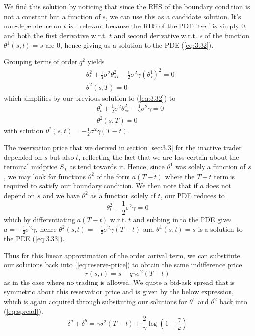 We find this solution by noticing
that since the RHS of the boundary condition is not a constant but a function of $s$,
we can use this as a candidate solution. It's non-dependence on $t$ is irrelevant 
because the RHS of the PDE itself is simply $0$, and both the first derivative w.r.t.
$t$ and second derivative w.r.t. $s$ of the function $\theta^1(s,t)=s$ are $0$, hence 
giving us a solution to the PDE (\ref{eq:3.32}). 

Grouping terms of order $q^2$ yields
\begin{equation}\label{eq:3.33}
    \begin{aligned}
        &\theta^2_t+\frac{1}{2}\sigma^2\theta^2_{ss}-\frac{1}{2}\sigma^2\gamma(\theta^1_s)^2=0\\
        &\theta^2(s,T)=0
    \end{aligned}
\end{equation}
which simplifies by our previous solution to (\ref{eq:3.32}) to
\begin{equation*}
    \begin{aligned}
        &\theta^2_t+\frac{1}{2}\sigma^2\theta^2_{ss}-\frac{1}{2}\sigma^2\gamma=0\\
        &\theta^2(s,T)=0
    \end{aligned}
\end{equation*}
with solution $\theta^2(s,t)=-\frac{1}{2}\sigma^2\gamma(T-t)$.

The reservation price that we derived in section \ref{sec:3.3} for the inactive trader 
depended on $s$ but also $t$, reflecting the fact that we are less certain about the 
terminal midprice $S_T$ as tend towards it. Hence, since $\theta^1$ was solely a function
of $s$, we may look for functions $\theta^2$ of the form $a(T-t)$ where the $T-t$ 
term is required to satisfy our boundary condition. We then note that if $a$ does not 
depend on $s$ and we have $\theta^2$ as a function solely of $t$, our PDE reduces to
\begin{equation*}
    \theta^2_t-\frac{1}{2}\sigma^2\gamma=0
\end{equation*}
which by differentiating $a(T-t)$ w.r.t. $t$ and subbing in to the PDE gives 
$a=-\frac{1}{2}\sigma^2\gamma$, hence $\theta^2(s,t)=-\frac{1}{2}\sigma^2\gamma(T-t)$
and $\theta^1(s,t)=s$ is a solution to the PDE (\ref{eq:3.33}).

Thus for this linear approximation of the order arrival term, we can substitute our
solutions back into (\ref{eq:reserve-price}) to obtain the same indifference price
\begin{equation}\label{eq:3.34}
    r(s,t)=s-q\gamma\sigma^2(T-t)
\end{equation}
as in the case where no trading is allowed. We quote a bid-ask spread that is symmetric
about this reservation price and is given by the below expression, which is again acquired
through subsituting our solutions for $\theta^1$ and $\theta^2$ back into (\ref{eq:spread}).
\begin{equation}\label{eq:3.35}
    \delta^a+\delta^b=\gamma\sigma^2(T-t)+\frac{2}{\gamma}\log\left(1+\frac{\gamma}{k}\right)
\end{equation}

